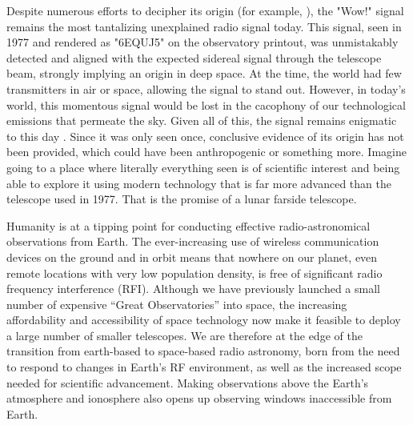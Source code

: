 Despite numerous efforts to decipher its origin (for example, \citealt{Wow_2024}), the "Wow!" signal  \citep{wow}  remains the most tantalizing unexplained radio signal today. This signal, seen in 1977 and rendered as "6EQUJ5" on the observatory printout, was unmistakably detected and aligned with the expected sidereal signal through the telescope beam, strongly implying an origin in deep space. At the time, the world had few transmitters in air or space, allowing the signal to stand out. However, in today's world, this momentous signal would be lost in the cacophony of our technological emissions that permeate the sky. Given all of this, the signal remains enigmatic to this day \citep{Saide_2023,Haqq_2025,Sheikh_2025}. Since it was only seen once, conclusive evidence of its origin has not been provided, which could have been anthropogenic or something more. Imagine going to a place where literally everything seen is of scientific interest and being able to explore it using modern technology that is far more advanced than the telescope used in 1977.   That is the promise of a lunar farside telescope.

Humanity is at a tipping point for conducting effective radio-astronomical observations from Earth. The ever-increasing use of wireless communication devices on the ground and in orbit means that nowhere on our planet, even remote locations with very low population density, is free of significant radio frequency interference (RFI). Although we have previously launched a small number of expensive ``Great Observatories'' into space, the increasing affordability and accessibility of space technology now make it feasible to deploy a large number of smaller telescopes. We are therefore at the edge of the transition from earth-based to space-based radio astronomy, born from the need to respond to changes in Earth's RF environment, as well as the increased scope needed for scientific advancement. Making observations above the Earth's atmosphere and ionosphere also opens up observing windows inaccessible from Earth.

